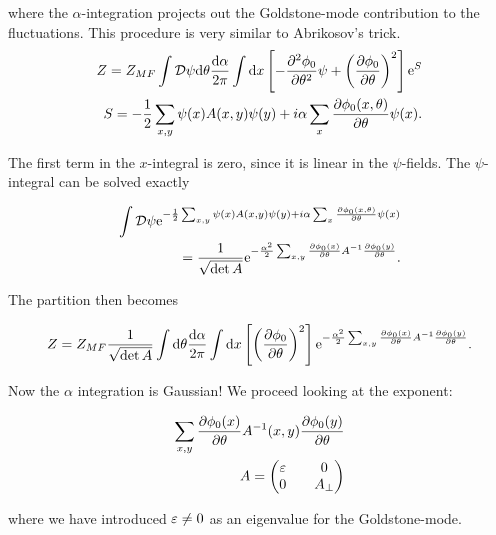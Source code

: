 where the $\alpha$-integration projects out the Goldstone-mode contribution to the fluctuations. This procedure is very similar to Abrikosov's trick. \\ 

\begin{align*}
    Z = Z_{MF} \int \mathcal{D} \psi \dd \theta \frac{\dd \alpha}{2\pi} \int \dd x \left[ -\pdv{^2\phi_0}{\theta^2} \psi + \left(\pdv{\phi_0}{\theta}\right)^2 \right] \mathrm{e}^{S} \\ 
    S = -\frac{1}{2}\sum_{x,y} \psi(x) A(x,y) \psi(y) + i\alpha \sum_x \pdv{\phi_0(x,\theta)}{\theta}\psi(x). 
\end{align*}

The first term in the $x$-integral is zero, since it is linear in the $\psi$-fields. The $\psi$-integral can be solved exactly 

\begin{align*}
    \int \mathcal{D} \psi \mathrm{e}^{-\frac{1}{2}\sum_{x,y} \psi(x) A(x,y) \psi(y) + i\alpha \sum_x \pdv{\phi_0(x,\theta)}{\theta}\psi(x)} \\ 
    = \frac{1}{\sqrt{\det A}}\mathrm{e}^{-\frac{\alpha^2}{2}\sum_{x,y} \pdv{\phi_0(x)}{\theta}A^{-1}\pdv{\phi_0(y)}{\theta}}.
\end{align*}

The partition then becomes 

\begin{align*}
    Z = Z_{MF} \frac{1}{\sqrt{\det A}} \int \dd \theta \frac{\dd \alpha}{2\pi} \int \dd x \left[\left(\pdv{\phi_0}{\theta}\right)^2 \right] \mathrm{e}^{-\frac{\alpha^2}{2}\sum_{x,y} \pdv{\phi_0(x)}{\theta}A^{-1}\pdv{\phi_0(y)}{\theta}}.
\end{align*}

Now the $\alpha$ integration is Gaussian! We proceed looking at the exponent: 

\begin{align*}
    \sum_{x,y} \pdv{\phi_0(x)}{\theta}A^{-1}(x,y)\pdv{\phi_0(y)}{\theta} \\ 
    A = \begin{pmatrix} \varepsilon && 0 \\ 0 && A_{\perp} \end{pmatrix}
\end{align*}

where we have introduced $\varepsilon \neq 0$ as an eigenvalue for the Goldstone-mode. 

